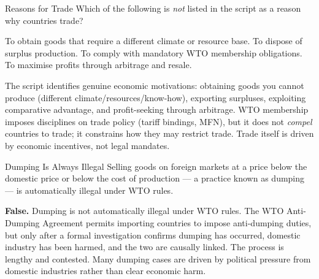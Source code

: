 \documentclass[paper=a5]{scrartcl}
\begin{document}
\begin{question}[type=mc]{Reasons for Trade}
Which of the following is \emph{not} listed in the script as a reason
why countries trade?
\begin{choices}
  \choice        To obtain goods that require a different climate or resource
                 base.
  \choice        To dispose of surplus production.
  \correctchoice To comply with mandatory WTO membership obligations.
  \choice        To maximise profits through arbitrage and resale.
\end{choices}
\begin{solution}
  The script identifies genuine economic motivations: obtaining goods you
  cannot produce (different climate/resources/know-how), exporting surpluses,
  exploiting comparative advantage, and profit-seeking through arbitrage.
  WTO membership imposes disciplines on trade policy (tariff bindings, MFN),
  but it does not \emph{compel} countries to trade; it constrains how they
  may restrict trade. Trade itself is driven by economic incentives, not
  legal mandates.
\end{solution}
\end{question}

\begin{question}[type=tf]{Dumping Is Always Illegal}
Selling goods on foreign markets at a price below the domestic price or
below the cost of production --- a practice known as dumping --- is
automatically illegal under WTO rules.
\truefalse[false]
\begin{solution}
  \textbf{False.} Dumping is not automatically illegal under WTO rules.
  The WTO Anti-Dumping Agreement permits importing countries to impose
  anti-dumping duties, but only after a formal investigation confirms
  dumping has occurred, domestic industry has been harmed, and the
  two are causally linked. The process is lengthy and contested. Many
  dumping cases are driven by political pressure from domestic industries
  rather than clear economic harm.
\end{solution}
\end{question}
\end{document}
